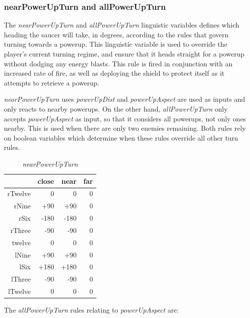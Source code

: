 \subsubsection{nearPowerUpTurn and allPowerUpTurn}

The \emph{nearPowerUpTurn} and \emph{allPowerUpTurn} linguistic variables defines which heading the saucer will take, in degrees, according to the rules that govern turning towards a powerup. This linguistic variable is used to override the player's current turning regime, and ensure that it heads straight for a powerup without dodging any energy blasts. This rule is fired in conjunction with an increased rate of fire, as well as deploying the shield to protect itself as it attempts to retrieve a powerup.

\emph{nearPowerUpTurn} uses \emph{powerUpDist} and \emph{powerUpAspect} are used as inputs and only reacts to nearby powerups. On the other hand, \emph{allPowerUpTurn} only accepts \emph{powerUpAspect} as input, so that it considers all powerups, not only ones nearby. This is used when there are only two enemies remaining. Both rules rely on boolean variables which determine when these rules override all other turn rules.

\begin{table}[H]
\centering
\caption{\emph{nearPowerUpTurn}}
\begin{tabular}{r|r|r|r}
 		& close 	& near	 	& far 		\\ \hline
rTwelve	& 0			& 0			& 0			\\
rNine	& +90		& +90		& 0			\\
rSix	& -180		& -180		& 0		 	\\
rThree	& -90		& -90		& 0	 		\\
twelve 	& 0			& 0 		& 0 		\\
lNine 	& +90		& +90 		& 0			\\
lSix	& +180		& +180 		& 0 		\\
lThree 	& -90		& -90 		& 0			\\
lTwelve	& 0			& 0 		& 0	 	
\end{tabular}
\end{table}

\noindent
The \emph{allPowerUpTurn} rules relating to \emph{powerUpAspect} are:


